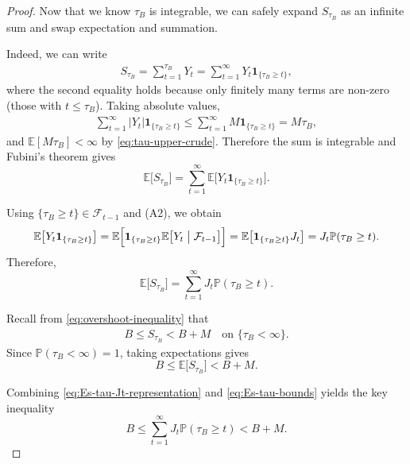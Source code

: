 \begin{proof}
\medskip

Now that we know $\tau_B$ is integrable, we can safely expand $S_{\tau_B}$ as an infinite sum and swap expectation and summation.

Indeed, we can write
\begin{align*}
  S_{\tau_B}
  = \sum_{t=1}^{\tau_B} Y_t
  = \sum_{t=1}^\infty Y_t\mathbf{1}_{\{\tau_B\geq t\}},
\end{align*}
where the second equality holds because only finitely many terms are non-zero (those with $t\leq\tau_B$). Taking absolute values,
\begin{align*}
  \sum_{t=1}^\infty |Y_t|\mathbf{1}_{\{\tau_B\geq t\}}
  \leq
  \sum_{t=1}^\infty M\mathbf{1}_{\{\tau_B\geq t\}}
  = M\tau_B,
\end{align*}
and $\mathbb{E}[M\tau_B]<\infty$ by \eqref{eq:tau-upper-crude}. Therefore the sum is integrable and Fubini's theorem gives
\begin{equation}
  \mathbb{E}\bigl[S_{\tau_B}\bigr]
  = \sum_{t=1}^\infty \mathbb{E}\bigl[Y_t\mathbf{1}_{\{\tau_B\geq t\}}\bigr].
  \label{eq:Es-tau-expansion}
\end{equation}

Using $\{\tau_B\geq t\}\in\mathcal{F}_{t-1}$ and (A2), we obtain
\begin{align*}
  \mathbb{E}\bigl[Y_t\mathbf{1}_{\{\tau_B\geq t\}}\bigr]
  = \mathbb{E}\Bigl[
      \mathbf{1}_{\{\tau_B\geq t\}}
      \mathbb{E}\bigl[Y_t \bigm| \mathcal{F}_{t-1}\bigr]
    \Bigr]
  = \mathbb{E}\bigl[\mathbf{1}_{\{\tau_B\geq t\}} J_t\bigr]
  = J_t \mathbb{P}(\tau_B\geq t).
\end{align*}
Therefore,
\begin{equation}
  \mathbb{E}\bigl[S_{\tau_B}\bigr]
  = \sum_{t=1}^\infty J_t\mathbb{P}(\tau_B\geq t).
  \label{eq:Es-tau-Jt-representation}
\end{equation}

Recall from \eqref{eq:overshoot-inequality} that
\begin{align*}
  B \leq S_{\tau_B} < B+M
  \quad\text{on } \{\tau_B<\infty\}.
\end{align*}
Since $\mathbb{P}(\tau_B<\infty)=1$, taking expectations gives
\begin{equation}
  B \leq \mathbb{E}\bigl[S_{\tau_B}\bigr] < B+M.
  \label{eq:Es-tau-bounds}
\end{equation}

Combining \eqref{eq:Es-tau-Jt-representation} and \eqref{eq:Es-tau-bounds} yields the key inequality
\begin{equation}
  B
  \leq
  \sum_{t=1}^\infty J_t\mathbb{P}(\tau_B\geq t)
  <
  B+M.
  \label{eq:key-ineq}
\end{equation}


\end{proof}
